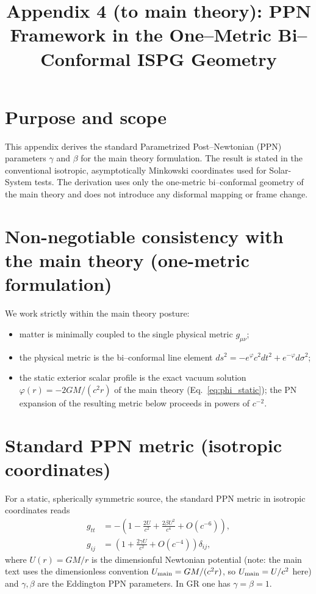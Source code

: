 \documentclass[11pt]{article}
\title{Appendix 4 (to main theory): PPN Framework in the One--Metric Bi--Conformal ISPG Geometry}
\author{}
\date{}
\begin{document}
\let\phi\varphi
\maketitle

\section*{Purpose and scope}
This appendix derives the standard Parametrized Post--Newtonian (PPN) parameters $\gamma$ and $\beta$ for the main theory formulation. The result is stated in the conventional isotropic, asymptotically Minkowski coordinates used for Solar-System tests. The derivation uses only the one-metric bi--conformal geometry of the main theory and does not introduce any disformal mapping or frame change.

\section*{Non-negotiable consistency with the main theory (one-metric formulation)}
We work strictly within the main theory posture:
\begin{itemize}
\item matter is minimally coupled to the single physical metric $g_{\mu\nu}$;
\item the physical metric is the bi--conformal line element $ds^2=-e^{\phi}c^2dt^2+e^{-\phi}d\sigma^2$;
\item the static exterior scalar profile is the exact vacuum solution $\phi(r)=-2GM/(c^2 r)$ of the main theory (Eq.~\eqref{eq:phi_static}); the PN expansion of the resulting metric below proceeds in powers of $c^{-2}$.
\end{itemize}

\section{Standard PPN metric (isotropic coordinates)}\label{sec:ppnstandard}
For a static, spherically symmetric source, the standard PPN metric in isotropic coordinates reads
\begin{align}
g_{tt} &= -\left(1-\frac{2U}{c^2}+\frac{2\beta U^2}{c^4}+O(c^{-6})\right),\label{eq:ppn_tt}\\
g_{ij} &= \left(1+\frac{2\gamma U}{c^2}+O(c^{-4})\right)\delta_{ij},\label{eq:ppn_ij}
\end{align}
where $U(r)=GM/r$ is the dimensionful Newtonian potential (note: the main text uses the dimensionless convention $U_{\rm main}=GM/(c^2 r)$, so $U_{\rm main} = U/c^2$ here) and $\gamma,\beta$ are the Eddington PPN parameters. In GR one has $\gamma=\beta=1$.
\end{document}
